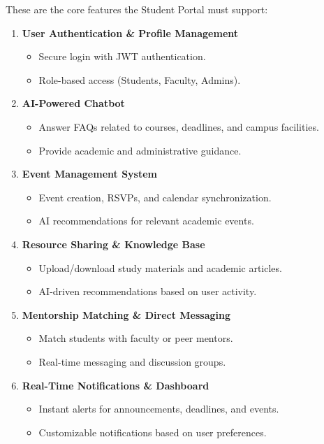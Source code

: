These are the core features the Student Portal must support:

\begin{enumerate}
    \item \textbf{User Authentication \& Profile Management}
    \begin{itemize}
        \item Secure login with JWT authentication.
        \item Role-based access (Students, Faculty, Admins).
    \end{itemize}

    \item \textbf{AI-Powered Chatbot}
    \begin{itemize}
        \item Answer FAQs related to courses, deadlines, and campus facilities.
        \item Provide academic and administrative guidance.
    \end{itemize}

    \item \textbf{Event Management System}
    \begin{itemize}
        \item Event creation, RSVPs, and calendar synchronization.
        \item AI recommendations for relevant academic events.
    \end{itemize}

    \item \textbf{Resource Sharing \& Knowledge Base}
    \begin{itemize}
        \item Upload/download study materials and academic articles.
        \item AI-driven recommendations based on user activity.
    \end{itemize}

    \item \textbf{Mentorship Matching \& Direct Messaging}
    \begin{itemize}
        \item Match students with faculty or peer mentors.
        \item Real-time messaging and discussion groups.
    \end{itemize}

    \item \textbf{Real-Time Notifications \& Dashboard}
    \begin{itemize}
        \item Instant alerts for announcements, deadlines, and events.
        \item Customizable notifications based on user preferences.
    \end{itemize}


\end{enumerate}
